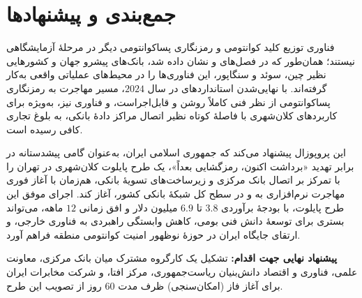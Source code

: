 \chapter{جمع‌بندی و پیشنهادها}
\label{chap:conclusions}

فناوری توزیع کلید کوانتومی و رمزنگاری پساکوانتومی دیگر در مرحلهٔ آزمایشگاهی نیستند؛ همان‌طور که در فصل‌های  و  نشان داده شد، بانک‌های پیشرو جهان و کشورهایی نظیر چین، سوئد و سنگاپور، این فناوری‌ها را در محیط‌های عملیاتی واقعی به‌کار گرفته‌اند. با نهایی‌شدن استانداردهای  در سال $2024$، مسیر مهاجرت به رمزنگاری پساکوانتومی از نظر فنی کاملاً روشن و قابل‌اجراست، و فناوری  نیز، به‌ویژه برای کاربردهای کلان‌شهری با فاصلهٔ کوتاه نظیر اتصال مراکز دادهٔ بانکی، به بلوغ تجاری کافی رسیده است.

این پروپوزال پیشنهاد می‌کند که جمهوری اسلامی ایران، به‌عنوان گامی پیشدستانه در برابر تهدید «برداشت اکنون، رمزگشایی بعداً»، یک طرح پایلوت کلان‌شهری در تهران را با تمرکز بر اتصال بانک مرکزی و زیرساخت‌های تسویهٔ بانکی، هم‌زمان با آغاز فوری مهاجرت نرم‌افزاری به  و  در سطح کل شبکهٔ بانکی کشور، آغاز کند. اجرای موفق این طرح پایلوت، با بودجهٔ برآوردی $3.8$ تا $6.9$ میلیون دلار و افق زمانی $12$ ماهه، می‌تواند بستری برای توسعهٔ دانش فنی بومی، کاهش وابستگی راهبردی به فناوری خارجی، و ارتقای جایگاه ایران در حوزهٔ نوظهور امنیت کوانتومی منطقه فراهم آورد.

\textbf{پیشنهاد نهایی جهت اقدام:} تشکیل یک کارگروه مشترک میان بانک مرکزی، معاونت علمی، فناوری و اقتصاد دانش‌بنیان ریاست‌جمهوری، مرکز افتا، و شرکت مخابرات ایران برای آغاز فاز  (امکان‌سنجی) ظرف مدت $60$ روز از تصویب این طرح.


